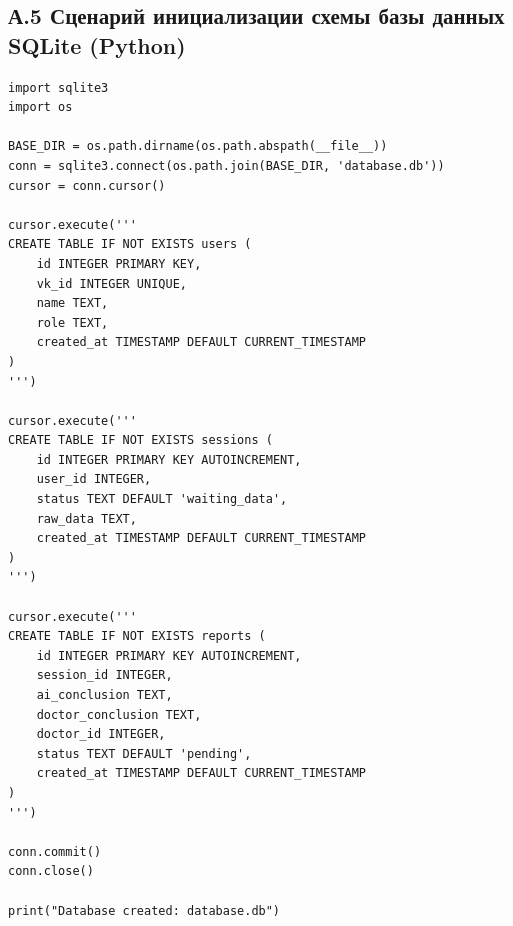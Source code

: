 \documentclass[utf8, russian]{eskdtext}
\begin{document}
\subsection*{А.5 Сценарий инициализации схемы базы данных SQLite (Python)}
\begin{verbatim}
import sqlite3
import os

BASE_DIR = os.path.dirname(os.path.abspath(__file__))
conn = sqlite3.connect(os.path.join(BASE_DIR, 'database.db'))
cursor = conn.cursor()

cursor.execute('''
CREATE TABLE IF NOT EXISTS users (
    id INTEGER PRIMARY KEY,
    vk_id INTEGER UNIQUE,
    name TEXT,
    role TEXT,
    created_at TIMESTAMP DEFAULT CURRENT_TIMESTAMP
)
''')

cursor.execute('''
CREATE TABLE IF NOT EXISTS sessions (
    id INTEGER PRIMARY KEY AUTOINCREMENT,
    user_id INTEGER,
    status TEXT DEFAULT 'waiting_data',
    raw_data TEXT,
    created_at TIMESTAMP DEFAULT CURRENT_TIMESTAMP
)
''')

cursor.execute('''
CREATE TABLE IF NOT EXISTS reports (
    id INTEGER PRIMARY KEY AUTOINCREMENT,
    session_id INTEGER,
    ai_conclusion TEXT,
    doctor_conclusion TEXT,
    doctor_id INTEGER,
    status TEXT DEFAULT 'pending',
    created_at TIMESTAMP DEFAULT CURRENT_TIMESTAMP
)
''')

conn.commit()
conn.close()

print("Database created: database.db")

\end{verbatim}

\normalsize
\end{document}
